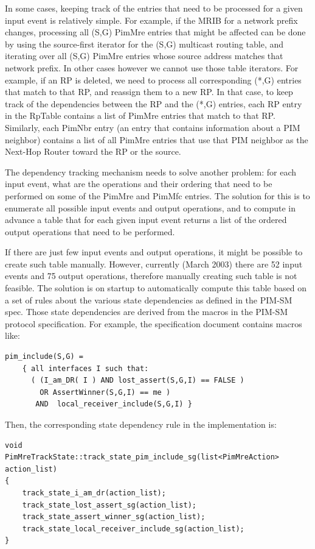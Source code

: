 \documentclass[11pt]{article}
\begin{document}
In some cases, keeping track of the entries that need to be processed
for a given input event is relatively simple. For example, if the MRIB
for a network prefix changes, processing all (S,G) PimMre entries that
might be affected can be done by using the source-first iterator for the
(S,G) multicast routing table, and iterating over all (S,G) PimMre
entries whose source address matches that network prefix. In other cases
however we cannot use those table iterators. For example, if an RP is
deleted, we need to process all corresponding (*,G) entries that match
to that RP, and reassign them to a new RP. In that case, to keep track
of the dependencies between the RP and the (*,G) entries, each RP entry
in the RpTable contains a list of PimMre entries that match to that
RP. Similarly, each PimNbr entry (an entry that contains information
about a PIM neighbor) contains a list of all PimMre entries that use
that PIM neighbor as the Next-Hop Router toward the RP or the source.

The dependency tracking mechanism needs to solve another problem: for
each input event, what are the operations and their ordering that need
to be performed on some of the PimMre and PimMfc entries.  The solution
for this is to enumerate all possible input events and output
operations, and to compute in advance a table that for each given
input event returns a list of the ordered output operations that need to
be performed.

If there are just few input events and output operations, it might be
possible to create such table manually. However, currently (March
2003) there are 52 input events and 75 output operations,
therefore manually creating such table is not feasible.
The solution is on startup to automatically compute this table based on
a set of rules about the various state dependencies as defined in the
PIM-SM spec. Those state dependencies are derived from the macros in the
PIM-SM protocol specification. For example, the specification document
contains macros like:

\begin{verbatim}
pim_include(S,G) =
    { all interfaces I such that:
      ( (I_am_DR( I ) AND lost_assert(S,G,I) == FALSE )
        OR AssertWinner(S,G,I) == me )
       AND  local_receiver_include(S,G,I) }
\end{verbatim}

Then, the corresponding state dependency rule in the implementation is:

\begin{verbatim}
void
PimMreTrackState::track_state_pim_include_sg(list<PimMreAction> action_list)
{
    track_state_i_am_dr(action_list);
    track_state_lost_assert_sg(action_list);
    track_state_assert_winner_sg(action_list);
    track_state_local_receiver_include_sg(action_list);
}
\end{verbatim}
\end{document}
